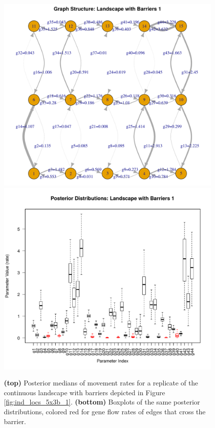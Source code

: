 \documentclass{article}
\begin{document}
\begin{figure}
\centering
     \includegraphics[height=0.3\textheight]{figs/grid_5x3b_1}
     \includegraphics[height=0.3\textheight]{figs/post_dists_5x3b_1_new}
    \caption{
    \textbf{(top)}
    Posterior medians of movement rates for a replicate of the continuous landscape
    with barriers depicted in Figure \ref{fig:ind_locs_5x3b_1}.
    \textbf{(bottom)}
    Boxplots of the same posterior distributions,
    colored red for gene flow rates of edges that cross the barrier.
    } \label{fig:post_dists_5x3b_1}
\end{figure}
\end{document}
